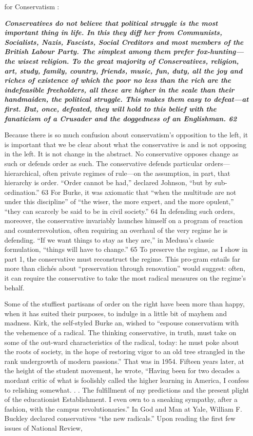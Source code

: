 for Conservatism :{\par} {\textbf{\textit{Conservatives do not believe that political struggle is the most important thing in life. In this they diff her from Communists, Socialists, Nazis, Fascists, Social Creditors and most members of the British Labour Party. The simplest among them prefer fox-hunting—the wisest religion. To the great majority of Conservatives, religion, art, study, family, country, friends, music, fun, duty, all the joy and riches of existence of which the poor no less than the rich are the indefeasible freeholders, all these are higher in the scale than their handmaiden, the political struggle. This makes them easy to defeat—at first. But, once, defeated, they will hold to this belief with the fanaticism of a Crusader and the doggedness of an Englishman. {\color{blue} 62 } } } }{\par} Because there is so much confusion about conservatism’s opposition to the left, it is important that we be clear about what the conservative is and is not opposing in the left. It is not change in the abstract. No conservative opposes change as such or defends order as such. The conservative defends particular orders—hierarchical, often private regimes of rule—on the assumption, in part, that hierarchy is order. “Order cannot be had,” declared Johnson, “but by sub-ordination.” {\color{blue} 63 } For Burke, it was axiomatic that “when the multitude are not under this discipline” of “the wiser, the more expert, and the more opulent,” “they can scarcely be said to be in civil society.” {\color{blue} 64 } In defending such orders, moreover, the conservative invariably launches himself on a program of reaction and counterrevolution, often requiring an overhaul of the very regime he is defending. “If we want things to stay as they are,” in Medusa’s classic formulation, “things will have to change.” {\color{blue} 65 } To preserve the regime, as I show in part 1, the conservative must reconstruct the regime. This pro-gram entails far more than clichés about “preservation through renovation” would suggest: often, it can require the conservative to take the most radical measures on the regime’s behalf.{\par} Some of the stuffiest partisans of order on the right have been more than happy, when it has suited their purposes, to indulge in a little bit of mayhem and madness. Kirk, the self-styled Burke an, wished to “espouse conservatism with the vehemence of a radical. The thinking conservative, in truth, must take on some of the out-ward characteristics of the radical, today: he must poke about the roots of society, in the hope of restoring vigor to an old tree strangled in the rank undergrowth of modern passions.” That was in 1954. Fifteen years later, at the height of the student movement, he wrote, “Having been for two decades a mordant critic of what is foolishly called the higher learning in America, I confess to relishing somewhat. . . The fulfillment of my predictions and the present plight of the educationist Establishment. I even own to a sneaking sympathy, after a fashion, with the campus revolutionaries.” In God and Man at Yale, William F. Buckley declared conservatives “the new radicals.” Upon reading the first few issues of National Review, 